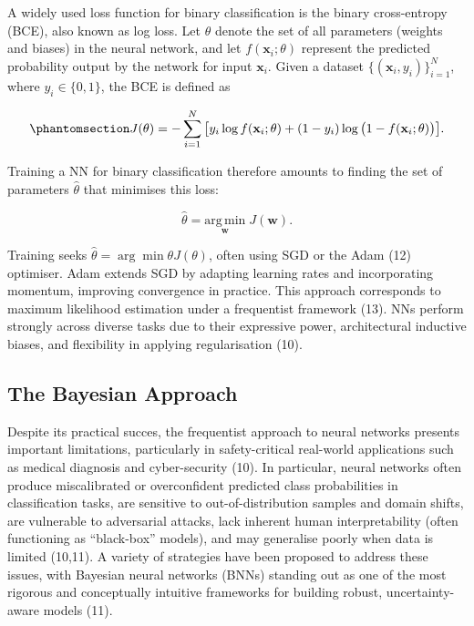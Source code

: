 \documentclass[
  a4paper,
]{scrreprt}
\begin{document}
A widely used loss function for binary classification is the binary
cross-entropy (BCE), also known as log loss. Let \(\theta\) denote the
set of all parameters (weights and biases) in the neural network, and
let \(f(\mathbf{x}_i; \theta)\) represent the predicted probability
output by the network for input \(\mathbf{x}_i\). Given a dataset
\(\{(\mathbf{x}_i, y_i)\}_{i=1}^N\), where \(y_i \in \{0,1\}\), the BCE
is defined as

\begin{equation}\phantomsection\label{eq-logloss}{
J(\theta) = -\sum_{i=1}^N \big[ y_i \log f(\mathbf{x}_i; \theta) + (1-y_i) \log \big( 1 - f(\mathbf{x}_i; \theta) \big) \big].
}\end{equation}

Training a NN for binary classification therefore amounts to finding the
set of parameters \(\hat{\theta}\) that minimises this loss:

\[
\hat{\theta} = \underset{\mathbf{w}}{\mathrm{arg\,min}} \; J(\mathbf{w}).
\]

Training seeks \(\hat{\theta} = \arg\min{\theta} J(\theta)\), often
using SGD or the Adam (12) optimiser. Adam extends SGD by adapting
learning rates and incorporating momentum, improving convergence in
practice. This approach corresponds to maximum likelihood estimation
under a frequentist framework (13). NNs perform strongly across diverse
tasks due to their expressive power, architectural inductive biases, and
flexibility in applying regularisation (10).

\subsection{The Bayesian Approach}\label{the-bayesian-approach}

Despite its practical succes, the frequentist approach to neural
networks presents important limitations, particularly in safety-critical
real-world applications such as medical diagnosis and cyber-security
(10). In particular, neural networks often produce miscalibrated or
overconfident predicted class probabilities in classification tasks, are
sensitive to out-of-distribution samples and domain shifts, are
vulnerable to adversarial attacks, lack inherent human interpretability
(often functioning as ``black-box'' models), and may generalise poorly
when data is limited (10,11). A variety of strategies have been proposed
to address these issues, with Bayesian neural networks (BNNs) standing
out as one of the most rigorous and conceptually intuitive frameworks
for building robust, uncertainty-aware models (11).
\end{document}
